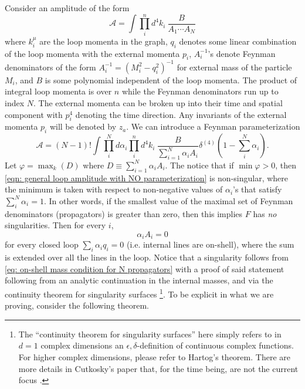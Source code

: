 \documentclass[a4paper,11pt]{article}
\begin{document}
Consider an amplitude of the form 
\begin{equation}
    \mathcal{A} = \int \prod_i^n d^4k_i\: \frac{B}{A_1\cdots A_N}\label{eqn: general loop amplitude with NO parameterization}
\end{equation}
where $k_i^\mu$ are the loop momenta in the graph, $q_i$ denotes some linear combination of the loop momenta with the external momenta $p_i$, $A_i^{-1}$'s denote Feynman denominators of the form $A_i^{-1} = (M_i^2-q_i^2)^{-1}$ for external mass of the particle $M_i$, and $B$ is some polynomial independent of the loop momenta. The product of integral loop momenta is over $n$ while the Feynman denominators run up to index $N$. The external momenta can be broken up into their time and spatial component with $p^4_i$ denoting the time direction. Any invariants of the external momenta $p_i$ will be denoted by $z_a$. We can introduce a Feynman parameterization
\begin{equation}
    \mathcal{A} = (N-1)!\int\prod_i^Nd\alpha_i\prod_i^nd^4k_i\:\frac{B}{\sum_{i=1}^N\alpha_iA_i}\delta^{(4)}\left(1-\sum_i^N\alpha_i\right)\label{eq: feynman paramterization of general loop integral}.
\end{equation}
Let $\varphi = \max_k(D)$ where $D\equiv \sum_{i=1}^N\alpha_iA_i$. The notice that if $\min\varphi>0$, then \eqref{eqn: general loop amplitude with NO parameterization} is non-singular, where the minimum is taken with respect to non-negative values of $\alpha_i$'s that satisfy $\sum_i^N\alpha_i = 1$. In other words, if the smallest value of the maximal set of Feynman denominators (propagators) is greater than zero, then this implies $F$ has \textit{no} singularities. Then for every $i$, 
\begin{equation}
\alpha_iA_i = 0\label{eq: on-shell mass condition for N propagators}
\end{equation}
for every closed loop $\sum_i\alpha_iq_i = 0$ (i.e. internal lines are on-shell), where the sum is extended over all the lines in the loop. Notice that a singularity follows from \eqref{eq: on-shell mass condition for N propagators} with a proof of said statement following from an analytic continuation in the internal masses, and via the continuity theorem for singularity surfaces \footnote{The ``continuity theorem for singularity surfaces'' here simply refers to in $d=1$ complex dimensions an $\epsilon,\delta$-definition of continuous complex functions. For higher complex dimensions, please refer to Hartog's theorem. There are more details in Cutkosky's paper that, for the time being, are not the current focus \cite{Cutkosky:1960sp}.}. To be explicit in what we are proving, consider the following theorem.
\end{document}
